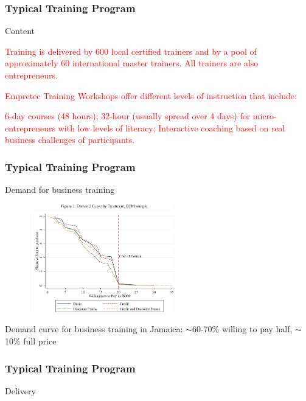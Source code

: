 \documentclass[hideothersubsections, usenames,dvipsnames,11pt]{beamer}
\newenvironment{itemize_2pt}{\itemize\addtolength{\itemsep}{2pt}}{\enditemize}
\begin{document}

\begin{frame}
\frametitle{Typical Training Program}
	Content
	\begin{itemize_2pt}
	\item \textcolor{red}{Training is delivered by 600 local certified trainers and by a pool of approximately 60 international master trainers. All trainers are also entrepreneurs.
	\item Empretec Training Workshops offer different levels of instruction that include:
	\item 6-day courses (48 hours); 32-hour (usually spread over 4 days) for micro-entrepreneurs with low levels of literacy; Interactive coaching based on real business challenges of participants.}
	\end{itemize_2pt}
\end{frame}

\begin{frame}
\frametitle{Typical Training Program}
	Demand for business training
	
	\begin{figure}[htbp]
	\centering
	\includegraphics[width=17em]{pics/Maffioli2020_demand.png}
	\label{Maffioli(2020): Demand}
\end{figure}

	\begin{itemize_2pt}
	\item Demand curve for business training in Jamaica: $\sim$60-70\% willing to pay half, $\sim$10\% full price \citep{Maffioli2020}
	\end{itemize_2pt}
\end{frame}

\begin{frame}
\frametitle{Typical Training Program}
	Delivery 
	\begin{itemize_2pt}
	\item %
	\vspace{0.1in}
	\end{itemize_2pt}
\end{frame}
\end{document}
